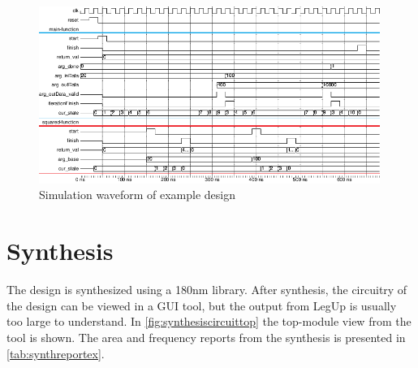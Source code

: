 \begin{figure}[hbpt]
\centering
\includegraphics[width=0.99\textwidth]{../figs/SimulationWaveEX.png}
\caption{\label{fig:simulationwave}Simulation waveform of example design}
\end{figure}
\section{Synthesis}
The design is synthesized using a 180nm library. After synthesis, the circuitry of the design can be viewed in a GUI tool, but the output from LegUp is usually too large to understand. In \cref{fig:synthesiscircuittop} the top-module view from the tool is shown. The area and frequency reports from the synthesis is presented in \cref{tab:synthreportex}.


